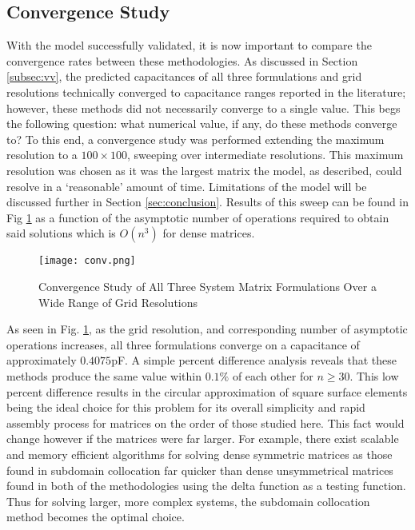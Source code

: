 \subsection{Convergence Study}
\label{subsec:cs}
With the model successfully validated, it is now important to compare the convergence rates between these methodologies. As discussed in Section \ref{subsec:vv}, the predicted capacitances of all three formulations and grid resolutions technically converged to capacitance ranges reported in the literature; however, these methods did not necessarily converge to a single value. This begs the following question: what numerical value, if any, do these methods converge to? To this end, a convergence study was performed extending the maximum resolution to a $100\times 100$, sweeping over intermediate resolutions. This maximum resolution was chosen as it was the largest matrix the model, as described, could resolve in a `reasonable' amount of time. Limitations of the model will be discussed further in Section \ref{sec:conclusion}. Results of this sweep can be found in Fig \ref{fig:convergence} as a function of the asymptotic number of operations required to obtain said solutions which is $O(n^3)$ for dense matrices. 

\begin{figure}[h!]  
	\centering
	\texttt{[image: conv.png]} 
	\caption{Convergence Study of All Three System Matrix Formulations Over a Wide Range of Grid Resolutions}
	\label{fig:convergence}
\end{figure}

As seen in Fig. \ref{fig:convergence}, as the grid resolution, and corresponding number of asymptotic operations increases, all three formulations converge on a capacitance of approximately $0.4075$pF. A simple percent difference analysis reveals that these methods produce the same value within $0.1\%$ of each other for $n\geq30$. This low percent difference results in the circular approximation of square surface elements being the ideal choice for this problem for its overall simplicity and rapid assembly process for matrices on the order of those studied here. This fact would change however if the matrices were far larger. For example, there exist scalable and memory efficient algorithms for solving dense symmetric matrices as those found in subdomain collocation far quicker than dense unsymmetrical matrices found in both of the methodologies using the delta function as a testing function\cite{densesym}. Thus for solving larger, more complex systems, the subdomain collocation method becomes the optimal choice.